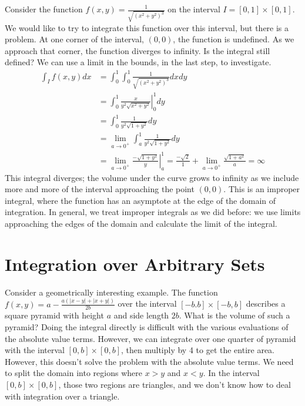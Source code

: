 \documentclass[fleqn,letterpaper]{report}
\begin{document}
\begin{example}
Consider the function $f(x,y) = \frac{1}{\sqrt{(x^2 +
y^2)^3}}$ on the interval $I = [0,1] \times [0,1]$. We would
like to try to integrate this function over this interval, but
there is a problem. At one corner of the interval, $(0,0)$,
the function is undefined. As we approach that corner, the
function diverges to infinity. Is the integral still defined?
We can use a limit in the bounds, in the last step, to
investigate.
\begin{align*}
\int_I f(x,y) dx & = \int_0^1 \int_0^1 \frac{1}{\sqrt{(x^2 +
y^2)^3}} dx dy \\
& = \int_0^1 \left. \frac{x}{y^2 \sqrt{x^2 + y^2}} \right|_0^1
dy \\
& = \int_0^1 \frac{1}{y^2 \sqrt{1 + y^2}} dy \\
& = \lim_{a \rightarrow 0^+} \int_a^1 \frac{1}{y^2 \sqrt{1 + y^2}} dy \\
& = \lim_{a \rightarrow 0^+} \left. \frac{-\sqrt{1+y^2}}{y}
\right|_a^1 = \frac{-\sqrt{2}}{1} + \lim_{a \rightarrow 0^+}
\frac{\sqrt{1+a^2}}{a} = \infty
\end{align*}
This integral diverges; the volume under the curve grows to
infinity as we include more and more of the interval
approaching the point $(0,0)$. This is an improper
integral, where the function has an asymptote at the edge of
the domain of integration. In general, we treat improper
integrals as we did before: we use limits approaching the
edges of the domain and calculate the limit of the integral.
\end{example}

\section{Integration over Arbitrary Sets}
\label{arbitrary-sets}

\begin{example}
Consider a geometrically interesting example.
The function $f(x,y) = a - \frac{a(|x-y| + |x+y|)}{2b}$ over
the interval $[-b.b] \times [-b,b]$ describes a square pyramid
with height $a$ and side length $2b$. What is the volume of
such a pyramid? Doing the integral directly is difficult with
the various evaluations of the absolute value terms. However,
we can integrate over one quarter of pyramid with the interval
$[0,b] \times [0,b]$, then multiply by 4 to get the entire
area. However, this doesn't solve the problem with the
absolute value terms. We need to split the domain into
regions where $x>y$ and $x<y$. In the interval $[0,b] \times
[0,b]$, those two regions are triangles, and we don't know how
to deal with integration over a triangle. 
\end{example}
\end{document}
